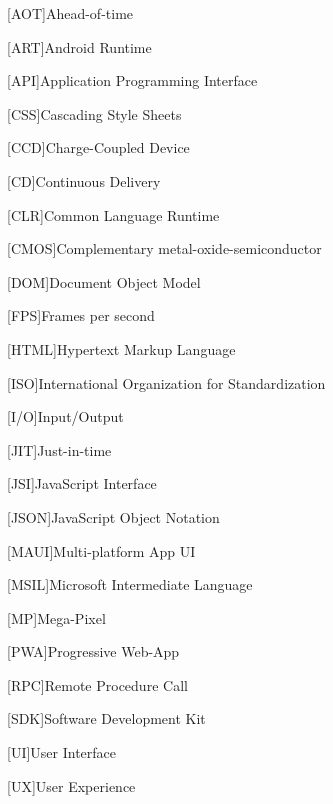 \begin{acronym}[AAAAA]

[AOT]{Ahead-of-time}

[ART]{Android Runtime}

[API]{Application Programming Interface}

[CSS]{Cascading Style Sheets}

[CCD]{Charge-Coupled Device}

[CD]{Continuous Delivery}

[CLR]{Common Language Runtime}

[CMOS]{Complementary metal-oxide-semiconductor}

[DOM]{Document Object Model}

[FPS]{Frames per second}

[HTML]{Hypertext Markup Language}

[ISO]{International Organization for Standardization}

[I/O]{Input/Output}

[JIT]{Just-in-time}

[JSI]{JavaScript Interface}

[JSON]{JavaScript Object Notation}

[MAUI]{Multi-platform App UI}

[MSIL]{Microsoft Intermediate Language}

[MP]{Mega-Pixel}

[PWA]{Progressive Web-App}

[RPC]{Remote Procedure Call}

[SDK]{Software Development Kit}

[UI]{User Interface}

[UX]{User Experience}

\end{acronym}